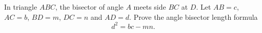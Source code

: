 In triangle $ABC$, the bisector of angle $A$ meets side $BC$ at $D$. Let $AB=c$, $AC=b$, $BD=m$, $DC=n$ and $AD=d$. Prove the angle bisector length formula
\[d^2=bc-mn.\]
